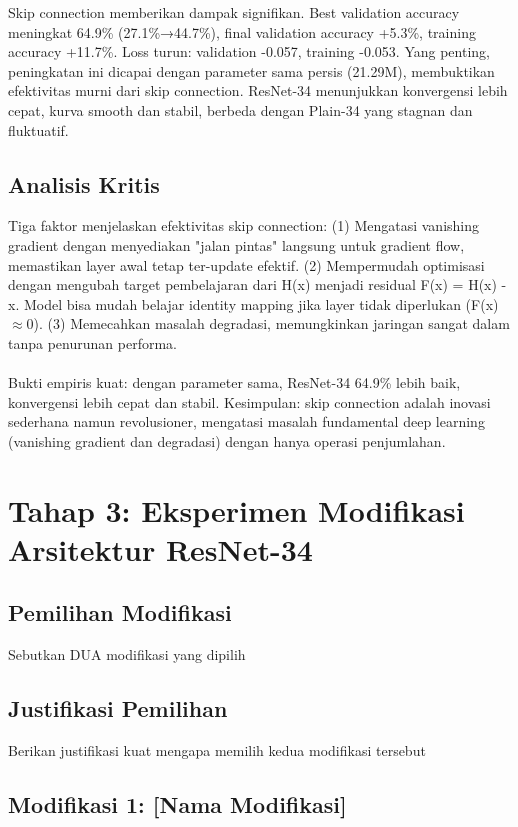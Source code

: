 \documentclass[11pt,a4paper]{article}
\begin{document}
Skip connection memberikan dampak signifikan. Best validation accuracy meningkat 64.9\% (27.1\%→44.7\%), final validation accuracy +5.3\%, training accuracy +11.7\%. Loss turun: validation -0.057, training -0.053. Yang penting, peningkatan ini dicapai dengan parameter sama persis (21.29M), membuktikan efektivitas murni dari skip connection. ResNet-34 menunjukkan konvergensi lebih cepat, kurva smooth dan stabil, berbeda dengan Plain-34 yang stagnan dan fluktuatif.

\subsection{Analisis Kritis}
Tiga faktor menjelaskan efektivitas skip connection: (1) Mengatasi vanishing gradient dengan menyediakan "jalan pintas" langsung untuk gradient flow, memastikan layer awal tetap ter-update efektif. (2) Mempermudah optimisasi dengan mengubah target pembelajaran dari H(x) menjadi residual F(x) = H(x) - x. Model bisa mudah belajar identity mapping jika layer tidak diperlukan (F(x)$\approx$0). (3) Memecahkan masalah degradasi, memungkinkan jaringan sangat dalam tanpa penurunan performa.\\\\Bukti empiris kuat: dengan parameter sama, ResNet-34 64.9\% lebih baik, konvergensi lebih cepat dan stabil. Kesimpulan: skip connection adalah inovasi sederhana namun revolusioner, mengatasi masalah fundamental deep learning (vanishing gradient dan degradasi) dengan hanya operasi penjumlahan.


\section{Tahap 3: Eksperimen Modifikasi Arsitektur ResNet-34}
\subsection{Pemilihan Modifikasi}
Sebutkan DUA modifikasi yang dipilih

\subsection{Justifikasi Pemilihan}
Berikan justifikasi kuat mengapa memilih kedua modifikasi tersebut

\subsection{Modifikasi 1: [Nama Modifikasi]}
\end{document}
